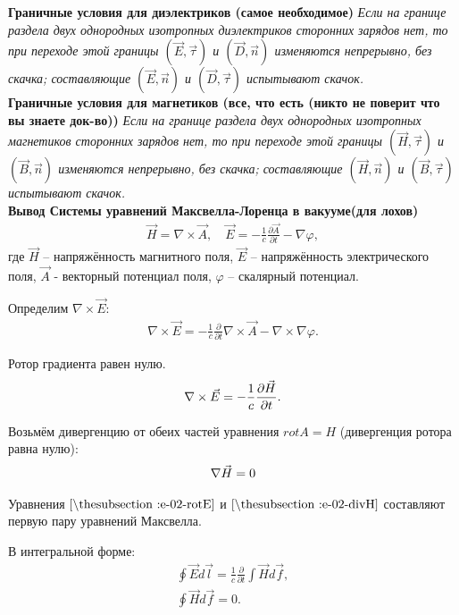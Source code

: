 \documentclass[__main__.tex]{subfiles}
\begin{document}
\textbf{Граничные условия для диэлектриков (самое необходимое)} \emph{Если на границе раздела двух однородных изотропных диэлектриков сторонних зарядов нет, то при переходе этой границы $(\vec{E},\vec{\tau})$ и $(\vec{D},\vec{n})$ изменяются непрерывно, без скачка; составляющие $(\vec{E},\vec{n})$ и $(\vec{D},\vec{\tau})$ испытывают скачок.}\\

\textbf{Граничные условия для магнетиков (все, что есть (никто не поверит что вы знаете док-во))} \emph{Если на границе раздела двух однородных изотропных магнетиков сторонних зарядов нет, то при переходе этой границы $(\vec{H},\vec{\tau})$ и $(\vec{B},\vec{n})$ изменяются непрерывно, без скачка; составляющие $(\vec{H},\vec{n})$ и $(\vec{B},\vec{\tau})$ испытывают скачок.}\\

\textbf{Вывод Системы уравнений Максвелла-Лоренца в вакууме(для лохов)}\\

\begin{gather*}
    \vec{H}=\nabla\times\vec{A},
    \quad
    \vec{E}=-\frac{1}{c}\frac{\partial\vec{A}}{\partial t}-\nabla\varphi,
\end{gather*}
где $\vec{H}$ -- напряжённость магнитного поля, $\vec{E}$ -- напряжённость электрического поля, $\vec{A}$ - векторный потенциал поля, $\varphi$ -- скалярный потенциал.

Определим $\nabla\times\vec{E}$:
\begin{gather*}
    \nabla\times\vec{E}=-\frac{1}{c}\frac{\partial}{\partial t}\nabla\times\vec{A}-\nabla\times\nabla\varphi.
\end{gather*}

Ротор градиента равен нулю.
\begin{gather}
    \llabel{e-02-rotE}
    \nabla\times\vec{E}=-\frac{1}{c}\frac{\partial\vec{H}}{\partial t}.
\end{gather}

Возьмём дивергенцию от обеих частей уравнения $rot A = H$ (дивергенция ротора равна нулю):
\begin{gather}
    \llabel{e-02-divH}
    \nabla\vec{H}=0
\end{gather}

Уравнения $\lref{e-02-rotE}$ и  $\lref{e-02-divH}$ составляют первую пару уравнений Максвелла.

В интегральной форме:
\begin{gather*}
    \oint\vec{E}d\vec{l}
    =
    \frac{1}{c}\frac{\partial}{\partial t}\int\vec{H}d\vec{f},\\
    \oint\vec{H}d\vec{f}=0.
\end{gather*}
\end{document}
